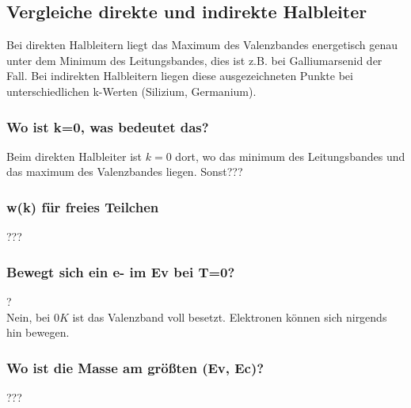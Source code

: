 \documentclass{article}
\begin{document}
\subsection{Vergleiche direkte und indirekte Halbleiter }\label{k4:inUndIndirekt}
    Bei direkten Halbleitern liegt das Maximum des Valenzbandes energetisch genau unter dem Minimum des Leitungsbandes, dies ist z.B. bei
    Galliumarsenid der Fall. Bei indirekten Halbleitern liegen diese ausgezeichneten Punkte bei unterschiedlichen k-Werten (Silizium, Germanium).
    \subsubsection{Wo ist k=0, was bedeutet das?}
    Beim direkten Halbleiter ist $k=0$ dort, wo das minimum des Leitungsbandes und das maximum des Valenzbandes liegen. Sonst???
    \subsubsection{w(k) für freies Teilchen}
    ???
    \subsubsection{Bewegt sich ein e- im Ev bei T=0?}
    ?\\
    Nein, bei $0K$ ist das Valenzband voll besetzt. Elektronen k\"onnen sich nirgends hin bewegen.
    \subsubsection{Wo ist die Masse am größten (Ev, Ec)?}
    ???
\end{document}
